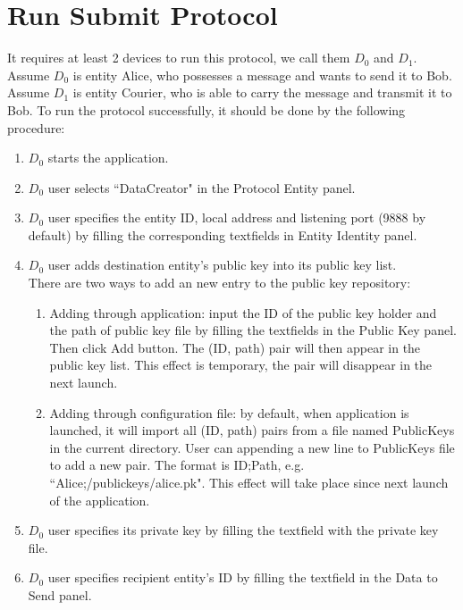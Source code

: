 \section{Run Submit Protocol}
It requires at least 2 devices to run this protocol, we call them $ D_0 $ and $ D_1 $. Assume $ D_0 $ is entity Alice, who possesses a message and wants to send it to Bob. Assume $ D_1 $ is entity Courier, who is able to carry the message and transmit it to Bob. To run the protocol successfully, it should be done by the following procedure:
\begin{enumerate}
\item $ D_0 $ starts the application.

\item $ D_0 $ user selects ``DataCreator" in the Protocol Entity panel.

\item $ D_0 $ user specifies the entity ID, local address and listening port (9888 by default) by filling the corresponding textfields in Entity Identity panel.

\item $ D_0 $ user adds destination entity's public key into its public key list.\\
There are two ways to add an new entry to the public key repository:
 \begin{enumerate}
 \item Adding through application: input the ID of the public key holder and the path of public key file by filling the textfields in the Public Key panel. Then click Add button. The (ID, path) pair will then appear in the public key list. This effect is temporary, the pair will disappear in the next launch.
 \item Adding through configuration file: by default, when application is launched, it will import all (ID, path) pairs from a file named PublicKeys in the current directory. User can appending a new line to PublicKeys file to add a new pair. The format is ID;Path, e.g. ``Alice;/publickeys/alice.pk". This effect will take place since next launch of the application.
 \end{enumerate}

\item $ D_0 $ user specifies its private key by filling the textfield with the private key file.

\item $ D_0 $ user specifies recipient entity's ID by filling the textfield in the Data to Send panel.


\end{enumerate}
